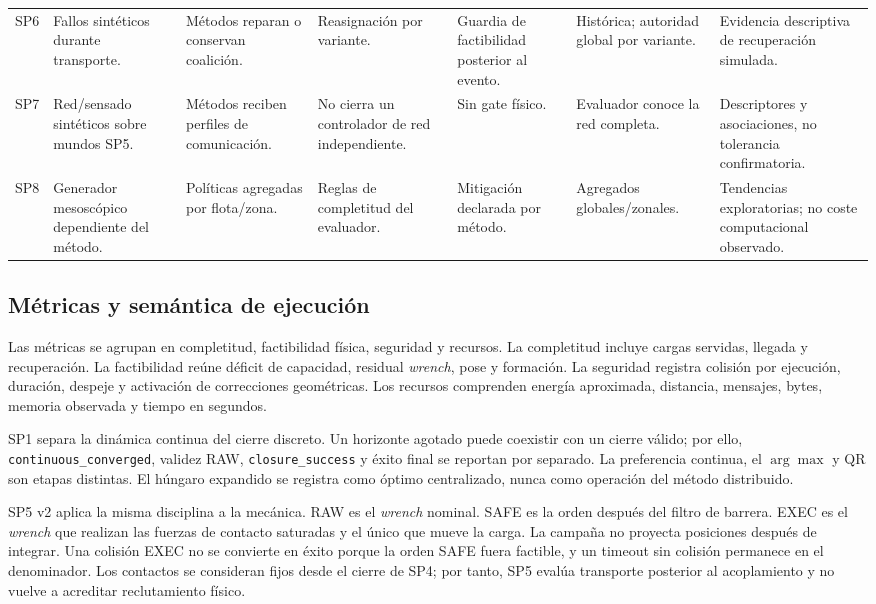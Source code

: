 \begin{landscape}
\begin{longtable}{p{1.3cm}p{2.6cm}p{3.0cm}p{2.5cm}p{2.5cm}p{2.4cm}p{2.7cm}}
SP6 & Fallos sintéticos durante transporte. & Métodos reparan o conservan coalición. & Reasignación por variante. & Guardia de factibilidad posterior al evento. & Histórica; autoridad global por variante. & Evidencia descriptiva de recuperación simulada. \\
SP7 & Red/sensado sintéticos sobre mundos SP5. & Métodos reciben perfiles de comunicación. & No cierra un controlador de red independiente. & Sin gate físico. & Evaluador conoce la red completa. & Descriptores y asociaciones, no tolerancia confirmatoria. \\
SP8 & Generador mesoscópico dependiente del método. & Políticas agregadas por flota/zona. & Reglas de completitud del evaluador. & Mitigación declarada por método. & Agregados globales/zonales. & Tendencias exploratorias; no coste computacional observado. \\
\bottomrule
\end{longtable}
\end{landscape}

\subsection{Métricas y semántica de ejecución}

Las métricas se agrupan en completitud, factibilidad física, seguridad y recursos. La completitud incluye cargas servidas, llegada y recuperación. La factibilidad reúne déficit de capacidad, residual \emph{wrench}, pose y formación. La seguridad registra colisión por ejecución, duración, despeje y activación de correcciones geométricas. Los recursos comprenden energía aproximada, distancia, mensajes, bytes, memoria observada y tiempo en segundos.

SP1 separa la dinámica continua del cierre discreto. Un horizonte agotado puede coexistir con un cierre válido; por ello, \texttt{continuous\_converged}, validez RAW, \texttt{closure\_success} y éxito final se reportan por separado. La preferencia continua, el $\arg\max$ y QR son etapas distintas. El húngaro expandido se registra como óptimo centralizado, nunca como operación del método distribuido.

SP5 v2 aplica la misma disciplina a la mecánica. RAW es el \emph{wrench} nominal. SAFE es la orden después del filtro de barrera. EXEC es el \emph{wrench} que realizan las fuerzas de contacto saturadas y el único que mueve la carga. La campaña no proyecta posiciones después de integrar. Una colisión EXEC no se convierte en éxito porque la orden SAFE fuera factible, y un timeout sin colisión permanece en el denominador. Los contactos se consideran fijos desde el cierre de SP4; por tanto, SP5 evalúa transporte posterior al acoplamiento y no vuelve a acreditar reclutamiento físico.

